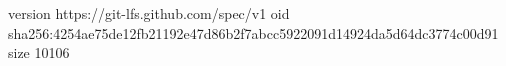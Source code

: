 version https://git-lfs.github.com/spec/v1
oid sha256:4254ae75de12fb21192e47d86b2f7abcc5922091d14924da5d64dc3774c00d91
size 10106

